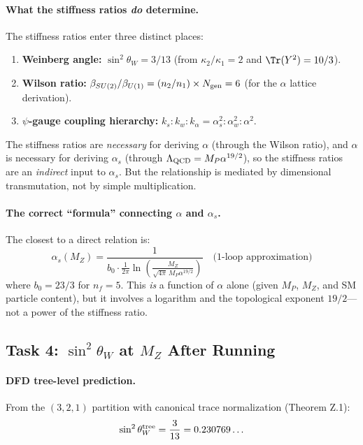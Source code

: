 \paragraph{What the stiffness ratios \emph{do} determine.}
The stiffness ratios enter three distinct places:
\begin{enumerate}
\item \textbf{Weinberg angle:} $\sin^2\theta_W = 3/13$ (from $\kappa_2/\kappa_1 = 2$ and $\Tr(Y^2) = 10/3$).
\item \textbf{Wilson ratio:} $\beta_{SU(2)}/\beta_{U(1)} = (n_2/n_1) \times N_{\rm gen} = 6$ (for the $\alpha$ lattice derivation).
\item \textbf{$\psi$-gauge coupling hierarchy:} $k_s : k_w : k_\alpha = \alpha_s^2 : \alpha_w^2 : \alpha^2$.
\end{enumerate}

The stiffness ratios are \emph{necessary} for deriving $\alpha$ (through the Wilson ratio),
and $\alpha$ is necessary for deriving $\alpha_s$ (through $\Lambda_{\rm QCD} = M_P \alpha^{19/2}$),
so the stiffness ratios are an \emph{indirect} input to $\alpha_s$. But the relationship
is mediated by dimensional transmutation, not by simple multiplication.

\paragraph{The correct ``formula'' connecting $\alpha$ and $\alpha_s$.}
The closest to a direct relation is:
\begin{equation}
\boxed{\alpha_s(M_Z) = \frac{1}{b_0 \cdot \frac{1}{2\pi}\ln\!\left(\frac{M_Z}{\sqrt{4\pi}\, M_P \alpha^{19/2}}\right)}}
\quad \text{(1-loop approximation)}
\end{equation}
where $b_0 = 23/3$ for $n_f = 5$. This \emph{is} a function of $\alpha$ alone
(given $M_P$, $M_Z$, and SM particle content), but it involves a logarithm and
the topological exponent $19/2$---not a power of the stiffness ratio.

\subsection{Task 4: $\sin^2\theta_W$ at $M_Z$ After Running}
\label{sec:weinberg-running}

\paragraph{DFD tree-level prediction.}
From the $(3,2,1)$ partition with canonical trace normalization (Theorem Z.1):
\begin{equation}
\sin^2\theta_W^{\rm tree} = \frac{3}{13} = 0.230769\ldots
\end{equation}

